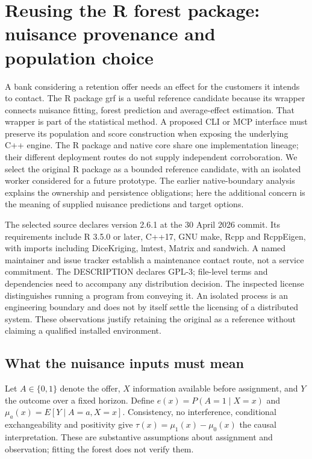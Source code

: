 \section{Reusing the R forest package: nuisance provenance and population choice}
\label{exec21:grfr-scope}
A bank considering a retention offer needs an effect for the customers it intends to contact. The R package grf is a useful reference candidate because its wrapper connects nuisance fitting, forest prediction and average-effect estimation. That wrapper is part of the statistical method. A proposed CLI or MCP interface must preserve its population and score construction when exposing the underlying C++ engine. The R package and native core share one implementation lineage; their different deployment routes do not supply independent corroboration. We select the original R package as a bounded reference candidate, with an isolated worker considered for a future prototype. The earlier native-boundary analysis explains the ownership and persistence obligations; here the additional concern is the meaning of supplied nuisance predictions and target options.\citep{exec21_grf_reuse,exec13_grf_memory}

The selected source declares version 2.6.1 at the 30 April 2026 commit. Its requirements include R 3.5.0 or later, C++17, GNU make, Rcpp and RcppEigen, with imports including DiceKriging, lmtest, Matrix and sandwich. A named maintainer and issue tracker establish a maintenance contact route, not a service commitment. The DESCRIPTION declares GPL-3; file-level terms and dependencies need to accompany any distribution decision. The inspected license distinguishes running a program from conveying it. An isolated process is an engineering boundary and does not by itself settle the licensing of a distributed system. These observations justify retaining the original as a reference without claiming a qualified installed environment.\citep{exec21_grf_reuse}

\subsection{What the nuisance inputs must mean}
\label{exec21:grfr-nuisance}
Let $A\in\{0,1\}$ denote the offer, $X$ information available before assignment, and $Y$ the outcome over a fixed horizon. Define $e(x)=P(A=1\mid X=x)$ and $\mu_a(x)=E[Y\mid A=a,X=x]$. Consistency, no interference, conditional exchangeability and positivity give $\tau(x)=\mu_1(x)-\mu_0(x)$ the causal interpretation. These are substantive assumptions about assignment and observation; fitting the forest does not verify them.

